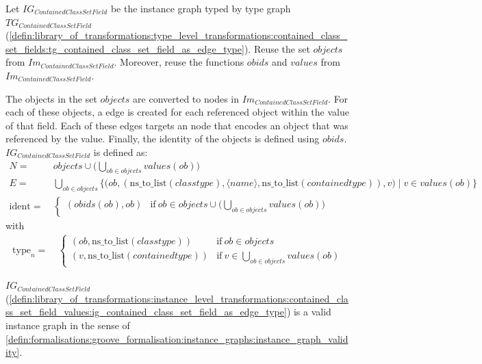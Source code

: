 \begin{defin}
\label{defin:library_of_transformations:instance_level_transformations:contained_class_set_field_values:ig_contained_class_set_field_as_edge_type}
Let $IG_{ContainedClassSetField}$ be the instance graph typed by type graph $TG_{ContainedClassSetField}$ (\cref{defin:library_of_transformations:type_level_transformations:contained_class_set_fields:tg_contained_class_set_field_as_edge_type}). Reuse the set $objects$ from $Im_{ContainedClassSetField}$. Moreover, reuse the functions $obids$ and $values$ from $Im_{ContainedClassSetField}$.

The objects in the set $objects$ are converted to nodes in $Im_{ContainedClassSetField}$. For each of these objects, a edge is created for each referenced object within the value of that field. Each of these edges targets an node that encodes an object that was referenced by the value. Finally, the identity of the objects is defined using $obids$. $IG_{ContainedClassSetField}$ is defined as:
\begin{align*}
N =\ & objects \cup \bigg(\bigcup_{ob \in objects} values(ob)\bigg)\\
E =\ & \bigcup_{ob \in objects} \big\{\big(ob, (\mathrm{ns\_\!to\_\!list}(classtype), \langle name \rangle, \mathrm{ns\_\!to\_\!list}(containedtype)), v\big) \mid v \in values(ob) \big\} \\
\mathrm{ident} =\ & \begin{cases}
    (obids(ob), ob) & \mathrm{if }\ ob \in objects \cup \Big(\bigcup_{ob \in objects} values(ob)\Big)
\end{cases}
\end{align*}
with
\begin{align*}
\mathrm{type}_n =\ & \begin{cases}
    (ob, \mathrm{ns\_\!to\_\!list}(classtype)) & \mathrm{if }\ ob \in objects\\
    (v, \mathrm{ns\_\!to\_\!list}(containedtype)) & \mathrm{if }\ v \in \bigcup_{ob \in objects} values(ob)
\end{cases}
\end{align*}
\end{defin}

\begin{thm}
\label{defin:library_of_transformations:instance_level_transformations:contained_class_set_field_values:ig_contained_class_set_field_as_edge_type_correct}
$IG_{ContainedClassSetField}$ (\cref{defin:library_of_transformations:instance_level_transformations:contained_class_set_field_values:ig_contained_class_set_field_as_edge_type}) is a valid instance graph in the sense of \cref{defin:formalisations:groove_formalisation:instance_graphs:instance_graph_validity}.
\end{thm}

